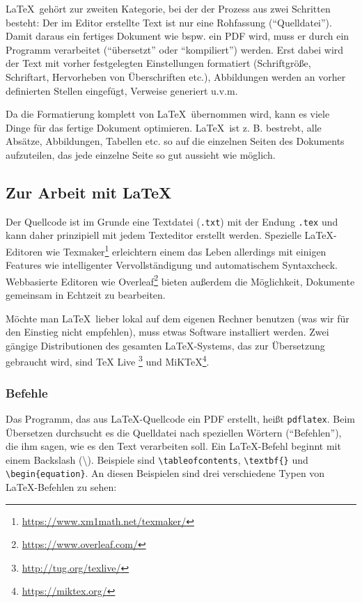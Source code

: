 \documentclass[titlepage, parskip=full*]{scrartcl}
\begin{document}
\LaTeX\ gehört zur zweiten Kategorie, bei der der Prozess aus zwei Schritten besteht: Der im Editor erstellte Text ist nur eine Rohfassung (\enquote{Quelldatei}). Damit daraus ein fertiges Dokument wie bspw. ein PDF wird, muss er durch ein Programm verarbeitet (\enquote{übersetzt} oder \enquote{kompiliert}) werden. Erst dabei wird der Text mit vorher festgelegten Einstellungen formatiert (Schriftgröße, Schriftart, Hervorheben von Überschriften etc.), Abbildungen werden an vorher definierten Stellen eingefügt, Verweise generiert u.v.m.

Da die Formatierung komplett von \LaTeX\ übernommen wird, kann es viele Dinge für das fertige Dokument optimieren. \LaTeX\ ist z. B. bestrebt, alle Absätze, Abbildungen, Tabellen etc. so auf die einzelnen Seiten des Dokuments aufzuteilen, das jede einzelne Seite so gut aussieht wie möglich.



\subsection{Zur Arbeit mit \LaTeX}
Der Quellcode ist im Grunde eine Textdatei (\texttt{.txt}) mit der Endung \texttt{.tex} und kann daher prinzipiell mit jedem Texteditor erstellt werden. Spezielle \LaTeX-Editoren wie Texmaker\footnote{\url{https://www.xm1math.net/texmaker/}} erleichtern einem das Leben allerdings mit einigen Features wie intelligenter Vervollständigung und automatischem Syntaxcheck. Webbasierte Editoren wie Overleaf\footnote{\url{https://www.overleaf.com/}} bieten außerdem die Möglichkeit, Dokumente gemeinsam in Echtzeit zu bearbeiten.

Möchte man \LaTeX\ lieber lokal auf dem eigenen Rechner benutzen (was wir für den Einstieg nicht empfehlen), muss etwas Software installiert werden. Zwei gängige Distributionen des gesamten \LaTeX-Systems, das zur Übersetzung gebraucht wird, sind TeX Live \footnote{\url{http://tug.org/texlive/}} und MiKTeX\footnote{\url{https://miktex.org/}}.

\subsubsection{Befehle}
Das Programm, das aus \LaTeX-Quellcode ein PDF erstellt, heißt \texttt{pdflatex}. Beim Übersetzen durchsucht es die Quelldatei nach speziellen Wörtern (\enquote{Befehlen}), die ihm sagen, wie es den Text verarbeiten soll. Ein \LaTeX-Befehl beginnt mit einem Backslash (\textbackslash). Beispiele sind \lstinline|\tableofcontents|, \lstinline|\textbf{}| und \lstinline|\begin{equation}|. An diesen Beispielen sind drei verschiedene Typen von \LaTeX-Befehlen zu sehen:
\end{document}

